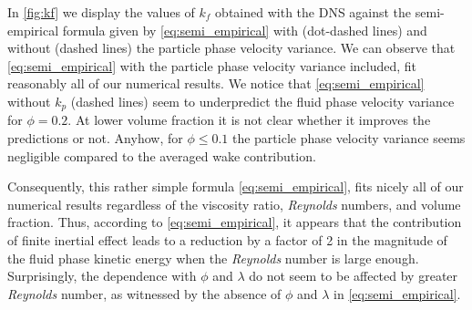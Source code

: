 In  \ref{fig:kf} we display the values of $k_f$ obtained with the DNS against the semi-empirical formula given by \ref{eq:semi_empirical} with (dot-dashed lines) and without (dashed lines) the particle phase velocity variance. 
We can observe that \ref{eq:semi_empirical} with the particle phase velocity variance included, fit reasonably all of our numerical results. 
We notice that \ref{eq:semi_empirical} without $k_p$ (dashed lines) seem to underpredict the fluid phase velocity variance for $\phi = 0.2$. 
At lower volume fraction it is not clear whether it improves the predictions or not. 
Anyhow, for $\phi \le 0.1$ the particle phase velocity variance seems negligible compared to the averaged wake contribution. 

Consequently, this rather simple formula \eqref{eq:semi_empirical},  fits nicely all of our numerical results regardless of the viscosity ratio, \textit{Reynolds} numbers, and volume fraction.  
Thus, according to \ref{eq:semi_empirical}, it appears that the contribution of finite inertial effect leads to a reduction by a factor of 2 in the magnitude of the fluid phase kinetic energy when the \textit{Reynolds} number is large enough. 
Surprisingly, the dependence with $\phi$ and $\lambda$ do not seem to be affected by greater \textit{Reynolds} number, as witnessed by the absence of $\phi$ and $\lambda$ in \ref{eq:semi_empirical}. 
